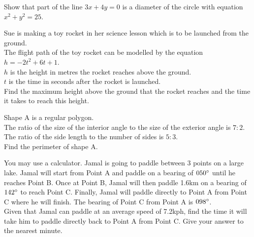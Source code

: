 \documentclass{exam}
\begin{document}
\begin{questions}
\begin{center}
    \end{center}
    \newpage

    \question Show that part of the line $3x+4y=0$ is a diameter of the circle with equation $x^2+y^2=25$.
    \newpage

    \question Sue is making a toy rocket in her science lesson which is to be launched from the ground.\\
    The flight path of the toy rocket can be modelled by the equation\\ $h=-2t^2+6t+1$.\\
    $h$ is the height in metres the rocket reaches above the ground.\\
    $t$ is the time in seconds after the rocket is launched.\\

    Find the maximum height above the ground that the rocket reaches and the time it takes to reach this height.
    \newpage

    \question Shape A is a regular polygon.\\
    The ratio of the size of the interior angle to the size of the exterior angle is $7:2$.
    The ratio of the side length to the number of sides is $5:3$.\\
    Find the perimeter of shape A.
    \newpage

    \question You may use a calculator. Jamal is going to paddle between 3 points on a large lake.
    Jamal will start from Point A and paddle on a bearing of $050\degree$ until he reaches Point B. Once at Point B, Jamal will then paddle 1.6km on a bearing of $142\degree$ to reach Point C. Finally, Jamal will paddle directly to Point A from Point C where he will finish.
    The bearing of Point C from Point A is $098\degree$.\\

    Given that Jamal can paddle at an average speed of 7.2kph, find the time it will take him to paddle directly back to Point A from Point C. Give your answer to the nearest minute.
    \newpage


\end{questions}
\end{document}
